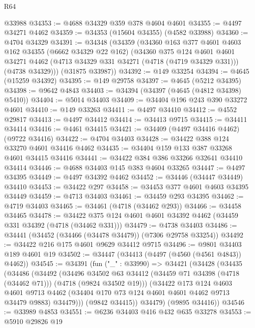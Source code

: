 \begin{lexlean}{R64}
\begin{coremodule}
    @33988
@34353 := @4688 @34329 @359 @378 @4604 @4601
@34355 := @4497 @34271 @4462
@34359 := @34353 (@15604 @34355) (@4582 @33988)
@34360 := @4704 @34329
@34391 := @34348
    (@34359
      (@34360
        @163
        @377
        @4601
        @4603
        @162
        @34355
        (@6662 @34329 @22 @162)
        (@34360
          @375
          @124
          @4601
          @4601
          @34271
          @4462
          (@4713 @34329 @331 @34271 (@4718 (@4719 @34329 @331)))
          (@4738 @34329)))
      (@31875 @33987))
@34392 := @149 @33254
@34394 := @4645 (@15259 @34392)
@34395 := @149 @29758
@34397 := @4645 (@5212 @34395)
@34398 := @9642 @4843
@34403 := @34394 (@34397 (@4645 (@4812 @34398) @5410))
@34404 := @5014 @34403
@34409 := @34404 @196 @243 @390 @33272 @4601
@34410 := @149 @33263
@34411 := @4497 @34410
@34412 := @4552 @29817
@34413 := @4497 @34412
@34414 := @34413 @9715
@34415 := @34411 @34414
@34416 := @4461 @34415
@34421 := @34409 (@4497 @34416 @4462) (@9722 @34416)
@34422 := @4704 @34403
@34428 := @34422 @388 @124 @33270 @4601 @34416 @4462
@34435 := @34404 @159 @133 @387 @33268 @4601 @34415 @34416
@34441 := @34422 @384 @386 @33266 @32641 @34410 @34414
@34446 := @4688 @34403 @145 @383 @4604 @33265
@34447 := @4497 @34395
@34449 := @4497 @34392 @4462
@34452 := @34446 (@34447 @34449) @34410
@34453 := @34422 @297
@34458 := @34453 @377 @4601 @4603 @34395 @34449
@34459 := @4713 @34403
@34461 := @34459 @293 @34395
@34462 := @4719 @34403
@34465 := @34461 (@4718 (@34462 @293))
@34466 := @34458 @34465
@34478 := @34422 @375 @124 @4601 @4601 @34392 @4462 (@34459 @331 @34392 (@4718 (@34462 @331)))
@34479 := @4738 @34403
@34486 := @34441 (@34452 (@34466 (@34478 @34479)) (@7306 @29758 @33254))
@34492 := @34422 @216 @175 @4601 @9629 @34412 @9715
@34496 := @9801 @34403 @189 @4601 @19
@34502 := @34447 (@34413 (@4497 (@4560 (@4561 @4843)) @4462))
@34545 := @34391
    (fun ("_" : @33990) =>
    @34421
      (@34428
        (@34435
          (@34486
            (@34492
              (@34496
                @34502
                @63
                @34412
                (@34459 @71 @34398 (@4718 (@34462 @71)))
                (@4718 (@9824 @34502 @19)))
              (@34422
                @173
                @124
                @4603
                @4601
                @9713
                @4462
                (@34404 @170 @73 @124 @4601 @4601 @4462 @9713 @34479 @9883)
                @34479)))
          (@9842 @34415))
        @34479)
      (@9895 @34416))
@34546 := @33989 @4853
@34551 := @6236 @34403 @416 @432 @635 @33278
@34553 := @5910 @29826 @19

\end{coremodule}
\end{lexlean}
